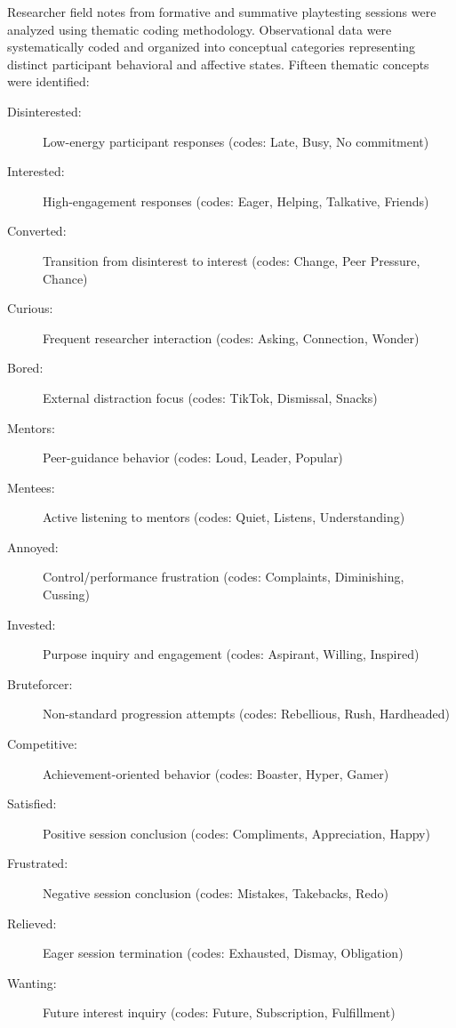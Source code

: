 Researcher field notes from formative and summative playtesting sessions were analyzed using thematic coding methodology. Observational data were systematically coded and organized into conceptual categories representing distinct participant behavioral and affective states.  Fifteen thematic concepts were identified:

\begin{description}
\item[Disinterested:] Low-energy participant responses (codes: Late, Busy, No commitment)
\item[Interested:] High-engagement responses (codes: Eager, Helping, Talkative, Friends)
\item[Converted:] Transition from disinterest to interest (codes: Change, Peer Pressure, Chance)
\item[Curious:] Frequent researcher interaction (codes: Asking, Connection, Wonder)
\item[Bored:] External distraction focus (codes: TikTok, Dismissal, Snacks)
\item[Mentors:] Peer-guidance behavior (codes: Loud, Leader, Popular)
\item[Mentees:] Active listening to mentors (codes: Quiet, Listens, Understanding)
\item[Annoyed:] Control/performance frustration (codes: Complaints, Diminishing, Cussing)
\item[Invested:] Purpose inquiry and engagement (codes: Aspirant, Willing, Inspired)
\item[Bruteforcer:] Non-standard progression attempts (codes: Rebellious, Rush, Hardheaded)
\item[Competitive:] Achievement-oriented behavior (codes: Boaster, Hyper, Gamer)
\item[Satisfied:] Positive session conclusion (codes: Compliments, Appreciation, Happy)
\item[Frustrated:] Negative session conclusion (codes: Mistakes, Takebacks, Redo)
\item[Relieved:] Eager session termination (codes: Exhausted, Dismay, Obligation)
\item[Wanting:] Future interest inquiry (codes: Future, Subscription, Fulfillment)
\end{description}

